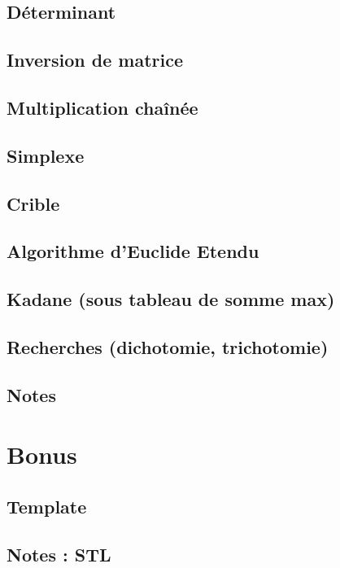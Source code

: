 \documentclass[10pt]{article}
\begin{document}
\subsection{Déterminant}
{\scriptsize}

\subsection{Inversion de matrice}
{\scriptsize}

\subsection{Multiplication chaînée}
{\scriptsize}

\subsection{Simplexe}
{\scriptsize}
 
\subsection{Crible}
{\scriptsize}

\subsection{Algorithme d'Euclide Etendu}
{\scriptsize}

\subsection{Kadane (sous tableau de somme max)}
{\scriptsize}



\subsection{Recherches (dichotomie, trichotomie)}


\subsection{Notes}



\section{Bonus}
\subsection{Template}
{\scriptsize}

\subsection{Notes : STL}

\end{document}
